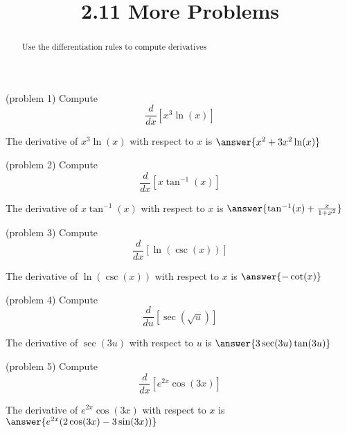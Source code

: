 \documentclass{ximera}
\title{2.11 More Problems}
\begin{document}
\begin{abstract}
Use the differentiation rules to compute derivatives
\end{abstract}

\maketitle








\begin{problem}(problem 1)
  Compute
  \[
  \frac{d}{dx}\left[x^3\ln(x)\right]
  \]
  
    
    
		The derivative of $x^3\ln (x)$ with respect to $x$ is
		 $\answer{x^2 + 3x^2\ln(x)}$
		
\end{problem}





\begin{problem}(problem 2)
  Compute
  \[
  \frac{d}{dx} \left[x \tan^{-1} (x)\right]
  \]
  
    
    
		The derivative of $x \tan^{-1} (x)$ with respect to $x$ is
		 $\answer{\tan^{-1}(x) + \frac{x}{1+x^2}}$
		
\end{problem}



\begin{problem}(problem 3)
  Compute
  \[
  \frac{d}{dx}\left[ \ln(\csc (x))\right]
  \]
  
    
    
		The derivative of $\ln(\csc (x))$ with respect to $x$ is
		 $\answer{-\cot(x)}$
		
\end{problem}



\begin{problem}(problem 4)
  Compute
  \[
  \frac{d}{du} \left[\sec(\sqrt u)\right]
  \]
  
    
    
		The derivative of $\sec(3u)$ with respect to $u$ is
		 $\answer{3\sec(3u)\tan(3u)}$
		
\end{problem}


\begin{problem}(problem 5)
  Compute
  \[
  \frac{d}{dx} \left[e^{2x} \cos(3x)\right]
  \]
  
   
    
		The derivative of $e^{2x} \cos(3x)$ with respect to $x$ is
		 $\answer{e^{2x}(2\cos(3x)-3\sin(3x))}$
		
\end{problem}
\end{document}
